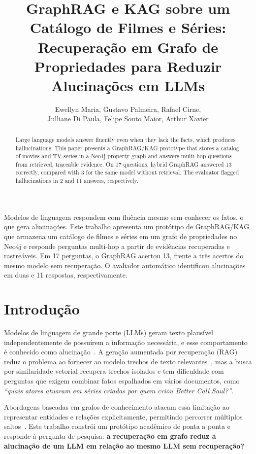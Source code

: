 \documentclass[12pt]{article}
\title{GraphRAG e KAG sobre um Catálogo de Filmes e Séries: \\
Recuperação em Grafo de Propriedades para Reduzir Alucinações em LLMs}
\author{Ewellyn Maria\inst{1}, Gustavo Palmeira\inst{1}, Rafael Cirne\inst{1},\\
Julliane Di Paula\inst{1}, Felipe Souto Maior\inst{1}, Arthur Xavier\inst{1}}
\begin{document}
\maketitle

\begin{abstract}
Large language models answer fluently even when they lack the facts, which produces
hallucinations. This paper presents a GraphRAG/KAG prototype that stores a catalog of movies and TV
series in a Neo4j property graph and answers multi-hop questions from retrieved, traceable evidence.
On 17 questions, hybrid GraphRAG answered 13 correctly, compared with 3 for the same model without retrieval. The evaluator flagged hallucinations in 2 and 11 answers, respectively.

\end{abstract}

\begin{resumo}
Modelos de linguagem respondem com fluência mesmo sem conhecer os fatos, o que gera alucinações.
Este trabalho apresenta um protótipo de GraphRAG/KAG que armazena um catálogo de filmes e séries
em um grafo de propriedades no Neo4j e responde perguntas multi-hop a partir de evidências
recuperadas e rastreáveis. Em 17 perguntas, o GraphRAG acertou 13, frente a três acertos do mesmo modelo sem recuperação. O avaliador automático identificou alucinações em duas e 11 respostas, respectivamente.

\end{resumo}

\section{Introdução}

Modelos de linguagem de grande porte (LLMs) geram texto plausível independentemente de possuírem a
informação necessária, e esse comportamento é conhecido como alucinação~\cite{ji2023survey}. A
geração aumentada por recuperação (RAG) reduz o problema ao fornecer ao modelo trechos de texto
relevantes~\cite{lewis2020rag}, mas a busca por similaridade vetorial recupera trechos isolados e tem
dificuldade com perguntas que exigem combinar fatos espalhados em vários documentos, como
\emph{``quais atores atuaram em séries criadas por quem criou Better Call Saul?''}.

Abordagens baseadas em grafos de conhecimento atacam essa limitação ao representar entidades e
relações explicitamente, permitindo percorrer múltiplos saltos~\cite{edge2024graphrag,liang2024kag}.
Este trabalho constrói um protótipo acadêmico de ponta a ponta e responde à pergunta de pesquisa:
\textbf{a recuperação em grafo reduz a alucinação de um LLM em relação ao mesmo LLM sem recuperação?}
\end{document}
